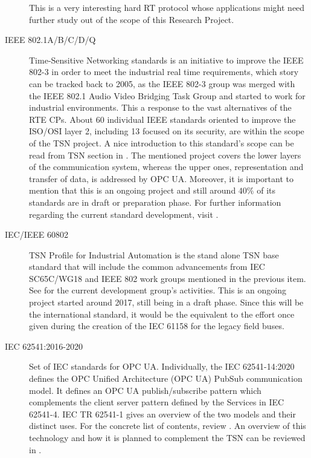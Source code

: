 \begin{description}
        This is a very interesting hard RT protocol whose applications might need further study out of the scope of this 
        Research Project.
    \item[IEEE 802.1A/B/C/D/Q] Time-Sensitive Networking standards is an initiative to improve the IEEE 802-3 in order to meet the industrial real time requirements, 
        which story can be tracked back to 2005, as the IEEE 802-3 group was merged with the IEEE 802.1 Audio Video Bridging Task Group and started to work for
        industrial environments. This a response to the vast alternatives of the RTE CPs. About 60 individual IEEE standards oriented to improve
        the ISO/OSI layer 2, including 13 focused on its security, are within the scope of the TSN project. A nice introduction to this standard's scope can be read from TSN 
        section in \cite{future_iiot}. %
        The mentioned project covers the lower layers of the communication system, whereas the upper ones, representation and transfer of data, is
        addressed by OPC UA. Moreover, it is important to mention that this is an ongoing project and still around $40\%$ of its standards are
        in draft or preparation phase. For further information regarding the current standard development, visit \cite{tsn_homepage}.
    \item[IEC/IEEE 60802] TSN Profile for Industrial Automation is the stand alone TSN base standard that will include the common advancements
        from IEC SC65C/WG18 and IEEE 802 work groups mentioned in the previous item. See \cite{tsn_profile} for the current development group's activities. %
        This is an ongoing project started around 2017, still being in a draft phase. Since this will be the international standard, it would be 
        the equivalent to the effort once given during the creation of the IEC 61158 for the legacy field buses.
    \item[IEC 62541:2016-2020] Set of IEC standards for OPC UA. Individually, the IEC 62541-14:2020 defines the OPC Unified Architecture 
        (OPC UA) PubSub communication model. It defines an OPC UA publish/subscribe pattern which complements the client server pattern defined 
        by the Services in IEC 62541-4. IEC TR 62541-1 gives an overview of the two models and their distinct uses. For the concrete list of contents, review \cite{opcua_standard}. %
        An overview of this technology and how it is planned to complement the TSN can be reviewed in \cite{opc_tsn_application}. %
\end{description}



